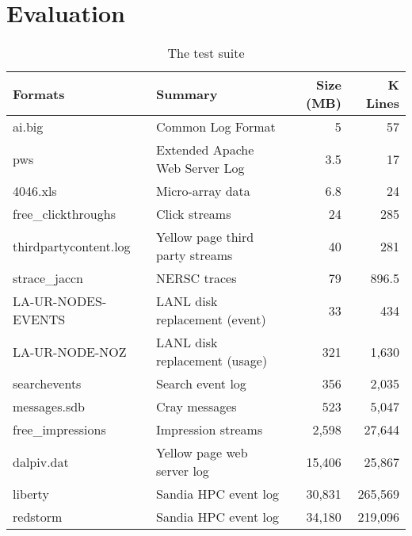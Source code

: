 \section{Evaluation} \label{sec:eval}

\begin{table*}[t]
\begin{center}
\begin{tabular}{|l|l|r|r|}\hline
{\bf Formats} & {\bf Summary} & {\bf Size (MB)} & {\bf K Lines} \\ \hline \hline 
ai.big 	& Common Log Format	& 5	& 57\\ \hline
pws  	& Extended Apache Web Server Log & 3.5 & 17 \\ \hline
4046.xls & Micro-array data & 6.8 & 24 \\ \hline
free\_clickthroughs & Click streams &  24 & 285 \\ \hline
thirdpartycontent.log & Yellow page third party streams & 40 & 281 \\ \hline
strace\_jaccn &	NERSC traces & 79 & 896.5 \\ \hline
LA-UR-NODES-EVENTS & LANL disk replacement (event) & 33 & 434 \\ \hline
LA-UR-NODE-NOZ & LANL disk replacement (usage) & 321 & 1,630 \\ \hline
searchevents & Search event log & 356 & 2,035 \\ \hline
messages.sdb & Cray messages & 523 &  5,047\\ \hline
free\_impressions & Impression streams & 2,598 & 27,644 \\ \hline
dalpiv.dat & Yellow page web server log & 15,406 & 25,867 \\ \hline
liberty & Sandia HPC event log & 30,831 & 265,569 \\ \hline
redstorm & Sandia HPC event log & 34,180 & 219,096 \\ \hline
\end{tabular}
\end{center}
\caption{The test suite}
\end{table*}

